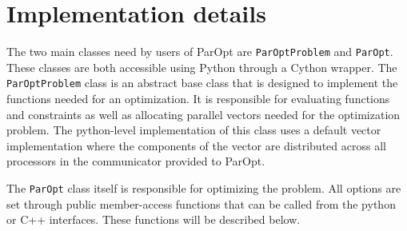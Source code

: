 \documentclass[12pt]{article}
\begin{document}
  





  







\section{Implementation details}

The two main classes need by users of ParOpt are \texttt{ParOptProblem} and \texttt{ParOpt}.
These classes are both accessible using Python through a Cython wrapper.
The \texttt{ParOptProblem} class is an abstract base class that is designed to implement the functions needed for an optimization. 
It is responsible for evaluating functions and constraints as well as allocating parallel vectors needed for the optimization problem.
The python-level implementation of this class uses a default vector implementation where the components of the vector are distributed across all processors in the communicator provided to ParOpt.

The \texttt{ParOpt} class itself is responsible for optimizing the problem.
All options are set through public member-access functions that can be called from the python or C++ interfaces.
These functions will be described below.
\end{document}

